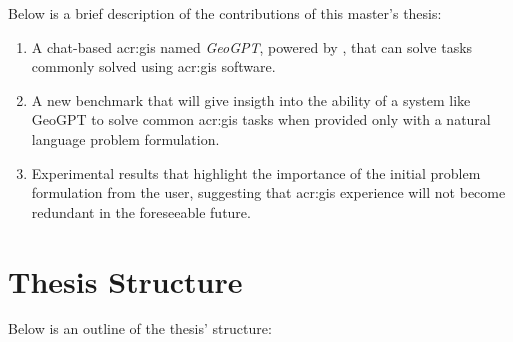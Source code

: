 Below is a brief description of the contributions of this master's thesis:

\begin{enumerate}
    \item A chat-based \acrshort{acr:gis} named \textit{GeoGPT}, powered by , that can solve tasks commonly solved using \acrshort{acr:gis} software.
    \item A new benchmark that will give insigth into the ability of a system like GeoGPT to solve common \acrshort{acr:gis} tasks when provided only with a natural language problem formulation.
    \item Experimental results that highlight the importance of the initial problem formulation from the user, suggesting that \acrshort{acr:gis} experience will not become redundant in the foreseeable future.
\end{enumerate}

\section{Thesis Structure}
\label{sec:thesis-structure}

\begin{comment}
This section provides the reader with an overview of what is coming in the next chapters.
You want to say more than what is explicit in the chapter name, if possible, but still keep the description short and to the point. So something along the lines of:

\begin{itemize}
    \item Chapter~\ref{cha:background_theory} introduces the theory, tools and methods necessary to understand the work.
    \item \textit{Lorem ipsum dolor sit amet, consectetur adipiscing elit.}
    \item Chapter~\ref{cha:conclusion} sums up the work and points to ways it can be improved or extended in the future.
\end{itemize}
\end{comment}

Below is an outline of the thesis' structure:

